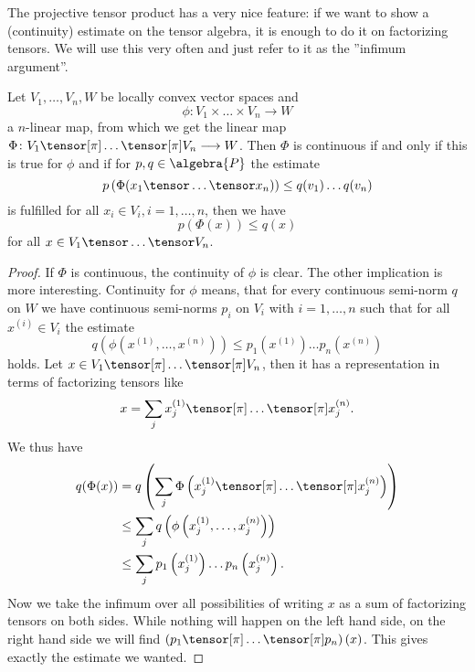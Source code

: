 The projective tensor product has a very nice feature: if we want to show a 
(continuity) estimate on the tensor algebra, it is enough to do it on 
factorizing tensors. We will use this very often and just refer to it as the 
''infimum argument''.
\begin{lemma}
	\label{Lemma:LCAna:InfimumArgument}
	Let $V_1, \ldots, V_n, W$ be locally convex vector spaces and 
	\begin{equation*}
		\phi \colon
		V_1 \times \ldots \times V_n
		\longrightarrow
		W
	\end{equation*}
	a $n$-linear map, from which we get the linear map 
	$\Phi \colon V_1 \tensor[\pi] \ldots \tensor[\pi] V_n \longrightarrow W$.
	Then $\Phi$ is continuous if and only if this is true for $\phi$ and if 
	for $p, q \in \algebra{P}$ the estimate
	\begin{equation*}
		p \left(
			\Phi (x_1 \tensor \ldots \tensor x_n)
		\right)
		\leq
		q(v_1) \ldots q(v_n)
	\end{equation*}
	is fulfilled for all $x_i \in V_i, i=1, \ldots, n$, then we have
	\begin{equation*}
		p \left(
			\Phi (x)
		\right)
		\leq
		q(x)
	\end{equation*}
	for all $x \in V_1 \tensor \ldots \tensor V_n$.
\end{lemma}
\begin{proof}
	If $\Phi$ is continuous, the continuity of $\phi$ is clear. 
	The other implication is more interesting.
	Continuity for $\phi$ means, that for every continuous semi-norm $q$ on 
	$W$ we have continuous semi-norms $p_i$ on $V_i$ with $i = 1, \ldots, n$ 
	such that for all $x^{(i)} \in V_i$ the estimate
	\begin{equation}
		\label{LCAna:ContiFactorTensors}
		q \left(
			\phi\left( x^{(1)}, \ldots, x^{(n)} \right)
		\right)
		\leq
		p_1 \left( x^{(1)} \right) 
		\ldots 
		p_n \left( x^{(n)} \right)
	\end{equation}
	holds. Let $x \in V_1 \tensor[\pi] \ldots \tensor[\pi] V_n$, then it 
	has a representation in terms of factorizing tensors like
	\begin{equation*}
		x
		=
		\sum_j
		x_j^{(1)} 
		\tensor[\pi] \ldots \tensor[\pi] 
		x_j^{(n)}.
	\end{equation*}
	We thus have
	\begin{align*}
		q( \Phi(x) )
		& =
		q \left(
			\sum_j
			\Phi \left(
				x_j^{(1)} 
				\tensor[\pi] \ldots \tensor[\pi] 
				x_j^{(n)}
			\right)
		\right)
		\\
		& \leq
		\sum_j
		q \left(
			\phi \left(
				x_j^{(1)} 
				, \ldots ,
				x_j^{(n)}
			\right)
		\right)
		\\
		& \leq
		\sum_j
		p_1 \left( x_j^{(1)} \right) 
		\ldots 
		p_n \left( x_j^{(n)} \right).
	\end{align*}
	Now we take the infimum over all possibilities of writing $x$ as a sum of 
	factorizing tensors on both sides. While nothing will happen on the left 
	hand side, on the right hand side we will find $\left( p_1 \tensor[\pi] 
	\ldots \tensor[\pi] p_n \right)(x)$. This gives exactly the estimate we 
	wanted.
\end{proof}


